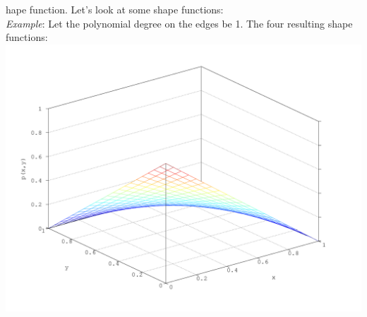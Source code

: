 \documentclass[a4paper,12pt]{article}
\begin{document}
hape function. Let's look at some shape functions:\\
\textit{Example}: Let the polynomial degree on the edges be 1. The four resulting shape functions:\\
\includegraphics[scale=0.35]{P1} 
\end{document}
